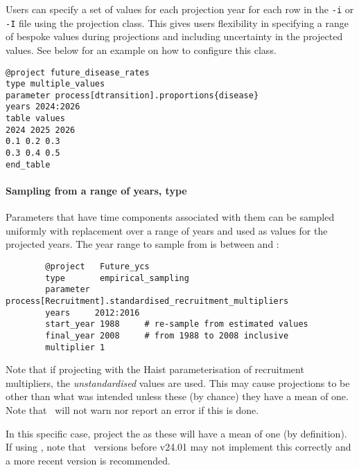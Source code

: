 Users can specify a set of values for each projection year for each row in the \texttt{-i} or \texttt{-I} file using the  projection class. This gives users flexibility in specifying a range of bespoke values during projections and including uncertainty in the projected values. See below for an example on how to configure this class.

{\small{\begin{verbatim}
@project future_disease_rates
type multiple_values
parameter process[dtransition].proportions{disease}  
years 2024:2026
table values
2024 2025 2026
0.1 0.2 0.3
0.3 0.4 0.5
end_table
\end{verbatim}}}

\paragraph[Empirical sampling]{Sampling from a range of years, type  }\label{sec:Project-EmpiricalSampling}

Parameters that have time components associated with them can be sampled uniformly with replacement over a range of years and used as values for the projected years. The year range to sample from is between  and :

{\small{\begin{verbatim}
		@project   Future_ycs
		type       empirical_sampling
		parameter  process[Recruitment].standardised_recruitment_multipliers
		years     2012:2016
		start_year 1988     # re-sample from estimated values
		final_year 2008     # from 1988 to 2008 inclusive
		multiplier 1
		\end{verbatim}}}

Note that if projecting  with the Haist parameterisation of recruitment multipliers, the \emph{unstandardised} values are used. This may cause projections to be other than what was intended unless these (by chance) they have a mean of one. Note that \CNAME\ will not warn nor report an error if this is done. 

In this specific case, project the  as these will have a mean of one (by definition). If using , note that \CNAME\ versions before v24.01 may not implement this correctly and a more recent version is recommended. 

